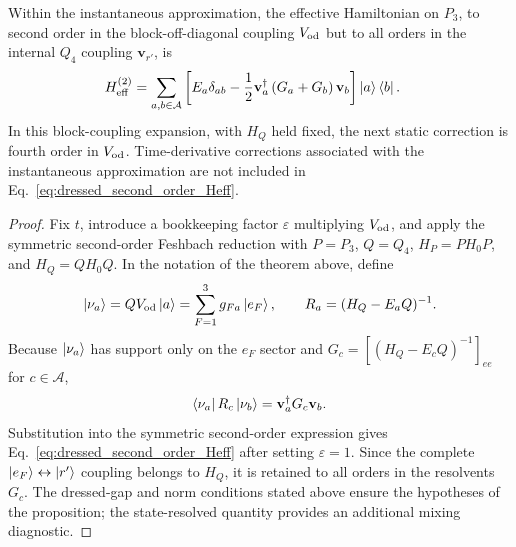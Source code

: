 \begin{theorem}
\label{thm:stark-elimination}
Within the instantaneous approximation, the effective Hamiltonian on $P_3$,
to second order in the block-off-diagonal coupling $V_{\rm od}$ but to all
orders in the internal $Q_4$ coupling $\mathbf v_{r'}$, is
\begin{align}
H_{\rm eff}^{(2)}
&=
\sum_{a,b\in\mathcal A}
\left[
E_a\delta_{ab}
-\frac12\mathbf v_a^\dagger
\left(G_a+G_b\right)
\mathbf v_b
\right]\ket a\bra b.
\label{eq:dressed_second_order_Heff}
\end{align}
In this block-coupling expansion, with $H_Q$ held fixed, the next static
correction is fourth order in $V_{\rm od}$.  Time-derivative corrections
associated with the instantaneous approximation are not included in
Eq.~\eqref{eq:dressed_second_order_Heff}.
\end{theorem}

\begin{proof}
Fix $t$, introduce a bookkeeping factor $\varepsilon$ multiplying
$V_{\rm od}$, and apply the symmetric second-order Feshbach reduction with
$P=P_3$, $Q=Q_4$, $H_P=PH_0P$, and $H_Q=QH_0Q$.  In the notation of
the theorem above, define
\begin{align}
\ket{\nu_a}
=QV_{\rm od}\ket a
=\sum_{F=1}^3g_{Fa}\ket{e_F},
\qquad
R_a=(H_Q-E_aQ)^{-1}.
\end{align}
Because $\ket{\nu_a}$ has support only on the $e_F$ sector and
$G_c=[(H_Q-E_cQ)^{-1}]_{ee}$ for $c\in\mathcal A$,
\begin{align}
\bra{\nu_a}R_c\ket{\nu_b}
=\mathbf v_a^\dagger G_c\mathbf v_b.
\end{align}
Substitution into the symmetric second-order expression gives
Eq.~\eqref{eq:dressed_second_order_Heff} after setting $\varepsilon=1$.
Since the complete
$\ket{e_F}\leftrightarrow\ket{r'}$ coupling belongs to $H_Q$, it is retained
to all orders in the resolvents $G_c$.  The dressed-gap and norm conditions
stated above ensure the hypotheses of the proposition; the state-resolved
quantity provides an additional mixing diagnostic.
\end{proof}

